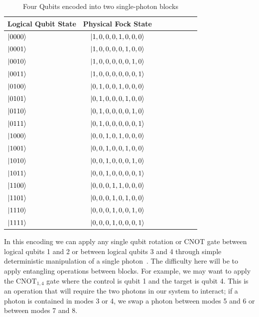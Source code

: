 \documentclass[aps,pra,twocolumn,showpacs,superscriptaddress,floatfix,10pt]{revtex4}
\begin{document}
\begin {table}[h]
\begin{center}
	\begin{tabular}{l*{6}{c}r} 
		Logical Qubit State      \quad \quad \quad     & Physical Fock State \\
		\hline 
		\quad \quad \quad $\ket{0000}$     & $\ket{1,0,0,0,1,0,0,0}$ \\
		\quad \quad \quad $\ket{0001}$            & $\ket{1,0,0,0,0,1,0,0}$ \\
		\quad \quad \quad $\ket{0010}$           & 
		$\ket{1,0,0,0,0,0,1,0}$ \\
		\quad \quad \quad $\ket{0011}$           & 
		$\ket{1,0,0,0,0,0,0,1}$ \\
		\quad \quad \quad $\ket{0100}$           & 
		$\ket{0,1,0,0,1,0,0,0}$ \\
		\quad \quad \quad $\ket{0101}$           & 
		$\ket{0,1,0,0,0,1,0,0}$ \\
		\quad \quad \quad $\ket{0110}$           & 
		$\ket{0,1,0,0,0,0,1,0}$ \\
		\quad \quad \quad $\ket{0111}$            & $\ket{0,1,0,0,0,0,0,1}$ \\
		\quad \quad \quad $\ket{1000}$            & $\ket{0,0,1,0,1,0,0,0}$ \\
		\quad \quad \quad $\ket{1001}$            & $\ket{0,0,1,0,0,1,0,0}$ \\
		\quad \quad \quad $\ket{1010}$            & $\ket{0,0,1,0,0,0,1,0}$ \\
		\quad \quad \quad $\ket{1011}$            & $\ket{0,0,1,0,0,0,0,1}$ \\
		\quad \quad \quad $\ket{1100}$            & $\ket{0,0,0,1,1,0,0,0}$ \\
		\quad \quad \quad $\ket{1101}$            & $\ket{0,0,0,1,0,1,0,0}$ \\
		\quad \quad \quad $\ket{1110}$            & $\ket{0,0,0,1,0,0,1,0}$ \\
		\quad \quad \quad $\ket{1111}$            & $\ket{0,0,0,1,0,0,0,1}$ \\
	\end{tabular}
	\caption{ \label{Block Encoding Table} Four Qubits encoded into two single-photon blocks}
\end{center}
\end{table}
In this encoding we can apply any single qubit rotation or CNOT gate between logical qubits 1 and 2 or between logical qubits 3 and 4 through simple deterministic manipulation of a single photon~\cite{Adami}. The difficulty here will be to apply entangling operations between blocks. For example, we may want to apply the $\mbox{CNOT}_{1,4}$ gate where the control is qubit 1 and the target is qubit 4. This is an operation that will require the two photons in our system to interact; if a photon is contained in modes 3 or 4, we swap a photon between modes 5 and 6 or between modes 7 and 8. 
\end{document}
